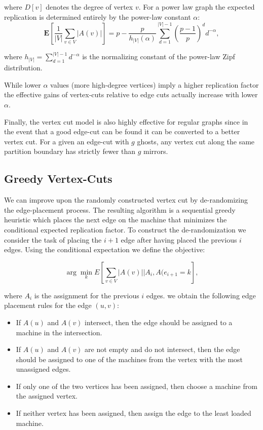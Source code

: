 \documentclass {article}
\begin{document}
where $D[v]$ denotes the degree of vertex $v$. For a power law graph the 
expected replication is determined entirely by the power-law constant
$\alpha$:
\begin{equation}
  \textbf{E}[\frac{1}{|V|}\sum_{v \in V}|A(v)|] =
  p - \frac{p}{h_{|V|}(\alpha)} \sum_{d=1}^{|V| - 1} (\frac{p-1}{p})^d
   d^{- \alpha},
\end{equation}

where $h_{|V|}=\sum_{d=1}^{|V|-1}d^{- \alpha}$ is the normalizing constant
of the power-law Zipf distribution.

While lower $\alpha$ values (more high-degree vertices) imply a higher 
replication factor the effective gains of vertex-cuts relative to edge 
cuts actually increase with lower $\alpha$.


Finally, the vertex cut model is also highly effective for
regular graphs since in the event that a good edge-cut can
be found it can be converted to a better vertex cut.
For a given an edge-cut with $g$ ghosts, any vertex cut along
the same partition boundary has strictly fewer than $g$ mirrors.

\subsection{Greedy Vertex-Cuts}
We can improve upon the randomly constructed vertex cut by 
de-randomizing the edge-placement process. The
resulting algorithm is a sequential greedy heuristic which
places the next edge on the machine that minimizes the
conditional expected replication factor. To construct the
de-randomization we consider the task of placing the $i+1$
edge after having placed the previous $i$ edges. Using the
conditional expectation we define the objective:

\begin{equation}
  \arg \min_k E[\sum_{v \in V}|A(v)| | A_i, A(e_{i+1}=k],
\end{equation}

where $A_i$ is the assignment for the previous $i$ edges.
we obtain the following edge placement rules for the edge
$(u,v)$:

\begin{itemize}
  \item If $A(u)$ and $A(v)$ intersect, then the edge should be
  assigned to a machine in the intersection.
  \item If $A(u)$ and $A(v)$ are not empty and do not intersect,
  then the edge should be assigned to one of the machines
  from the vertex with the most unassigned edges.
  \item If only one of the two vertices has been assigned, then
  choose a machine from the assigned vertex.
  \item If neither vertex has been assigned, then assign the
  edge to the least loaded machine.
\end{itemize}
\end{document}
